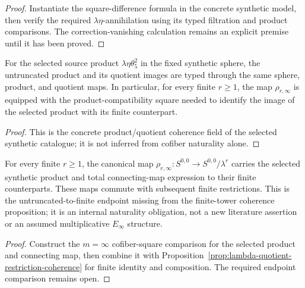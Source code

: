 \begin{proof}
  Instantiate the square-difference formula in the concrete synthetic model,
  then verify the required $\lambda\eta$-annihilation using its typed
  filtration and product comparisons. The correction-vanishing calculation
  remains an explicit premise until it has been proved.
\end{proof}

\begin{proposition}
  \label{prop:theta5-selected-product-quotient-compatibility}
  \notready
  For the selected source product $\lambda\eta\theta_5^2$ in the fixed
  synthetic sphere, the untruncated product and its quotient images are typed
  through the same sphere, product, and quotient maps.  In particular, for
  every finite $r\ge1$, the map $\rho_{r,\infty}$ is equipped with the
  product-compatibility square needed to identify the image of the selected
  product with its finite counterpart.
\end{proposition}

\begin{proof}
  This is the concrete product/quotient coherence field of the selected
  synthetic catalogue; it is not inferred from cofiber naturality alone.
\end{proof}

\begin{proposition}
  \label{prop:theta5-total-quotient-transport}
  \notready
  For every finite $r\ge1$, the canonical map
  $\rho_{r,\infty}:S^{0,0}\to S^{0,0}/\lambda^r$ carries the selected
  synthetic product and total connecting-map expression to their finite
  counterparts.  These maps commute with subsequent finite restrictions.
  This is the untruncated-to-finite endpoint missing from the finite-tower
  coherence proposition; it is an internal naturality obligation, not a new
  literature assertion or an assumed multiplicative $E_\infty$ structure.
\end{proposition}

\begin{proof}
  Construct the $m=\infty$ cofiber-square comparison for the selected
  product and connecting map, then combine it with
  Proposition~\ref{prop:lambda-quotient-restriction-coherence} for finite
  identity and composition.  The required endpoint comparison remains open.
\end{proof}

